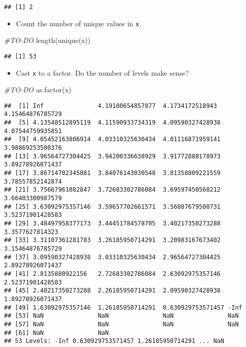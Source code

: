 \documentclass[
]{article}
\newenvironment{Shaded}{\begin{snugshade}}{\end{snugshade}}
\newcommand{\CommentTok}[1]{\textcolor[rgb]{0.56,0.35,0.01}{\textit{#1}}}
\newcommand{\FunctionTok}[1]{\textcolor[rgb]{0.00,0.00,0.00}{#1}}
\newcommand{\NormalTok}[1]{#1}
\providecommand{\tightlist}{%
  \setlength{\itemsep}{0pt}\setlength{\parskip}{0pt}}
\begin{document}
\begin{verbatim}
## [1] 2
\end{verbatim}

\begin{itemize}
\tightlist
\item
  Count the number of unique values in \texttt{x}.
\end{itemize}

\begin{Shaded}
\begin{Highlighting}[]
\CommentTok{\#TO{-}DO}
\FunctionTok{length}\NormalTok{(}\FunctionTok{unique}\NormalTok{(x))}
\end{Highlighting}
\end{Shaded}

\begin{verbatim}
## [1] 53
\end{verbatim}

\begin{itemize}
\tightlist
\item
  Cast \texttt{x} to a factor. Do the number of levels make sense?
\end{itemize}

\begin{Shaded}
\begin{Highlighting}[]
\CommentTok{\#TO{-}DO}
\FunctionTok{as.factor}\NormalTok{(x)}
\end{Highlighting}
\end{Shaded}

\begin{verbatim}
##  [1] Inf               4.19180654857877  4.1734172518943   4.15464876785729 
##  [5] 4.13548512895119  4.11590933734319  4.09590327428938  4.07544759935851 
##  [9] 4.05452163806914  4.03310325630434  4.01116871959141  3.98869253500376 
## [13] 3.96564727304425  3.94200336638929  3.91772888178973  3.89278926071437 
## [17] 3.86714702345081  3.84076143030548  3.81358809221559  3.78557852142874 
## [21] 3.75667961082847  3.72683302786084  3.69597450568212  3.66403300987579 
## [25] 3.63092975357146  3.59657702661571  3.56087679500731  3.52371901428583 
## [29] 3.48497958377173  3.44451784578705  3.40217350273288  3.3577627814323  
## [33] 3.31107361281783  3.26185950714291  3.20983167673402  3.15464876785729 
## [37] 3.09590327428938  3.03310325630434  2.96564727304425  2.89278926071437 
## [41] 2.8135880922156   2.72683302786084  2.63092975357146  2.52371901428583 
## [45] 2.40217350273288  2.26185950714291  2.09590327428938  1.89278926071437 
## [49] 1.63092975357146  1.26185950714291  0.630929753571457 -Inf             
## [53] NaN               NaN               NaN               NaN              
## [57] NaN               NaN               NaN               NaN              
## [61] NaN               NaN              
## 53 Levels: -Inf 0.630929753571457 1.26185950714291 ... NaN
\end{verbatim}
\end{document}
